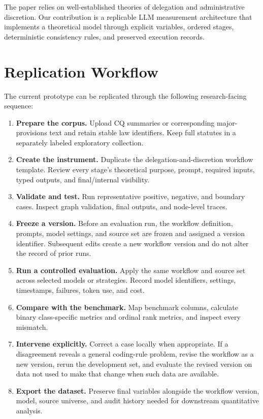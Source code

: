 \documentclass[runningheads]{llncs}
\begin{document}
The paper relies on well-established theories of delegation and administrative discretion. Our contribution is a replicable LLM measurement architecture that implements a theoretical model through explicit variables, ordered stages, deterministic consistency rules, and preserved execution records.


\section{Replication Workflow}

The current prototype can be replicated through the following research-facing sequence:
\begin{enumerate}[nosep]
  \item \textbf{Prepare the corpus.} Upload CQ summaries or corresponding major-provisions text and retain stable law identifiers. Keep full statutes in a separately labeled exploratory collection.
  \item \textbf{Create the instrument.} Duplicate the delegation-and-discretion workflow template. Review every stage's theoretical purpose, prompt, required inputs, typed outputs, and final/internal visibility.
  \item \textbf{Validate and test.} Run representative positive, negative, and boundary cases. Inspect graph validation, final outputs, and node-level traces.
  \item \textbf{Freeze a version.} Before an evaluation run, the workflow definition, prompts, model settings, and source set are frozen and assigned a version identifier. Subsequent edits create a new workflow version and do not alter the record of prior runs.
  \item \textbf{Run a controlled evaluation.} Apply the same workflow and source set across selected models or strategies. Record model identifiers, settings, timestamps, failures, token use, and cost.
  \item \textbf{Compare with the benchmark.} Map benchmark columns, calculate binary class-specific metrics and ordinal rank metrics, and inspect every mismatch.
  \item \textbf{Intervene explicitly.} Correct a case locally when appropriate. If a disagreement reveals a general coding-rule problem, revise the workflow as a new version, rerun the development set, and evaluate the revised version on data not used to make that change when such data are available.
  \item \textbf{Export the dataset.} Preserve final variables alongside the workflow version, model, source universe, and audit history needed for downstream quantitative analysis.
\end{enumerate}
\end{document}
